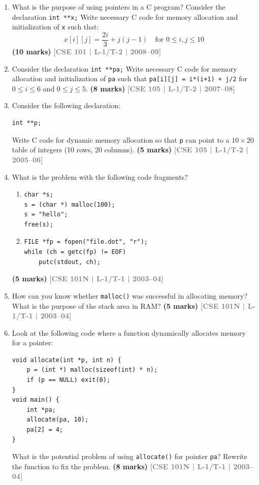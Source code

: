 \documentclass[12pt,a3paper]{article}
\newcommand{\yr}[1]{\hfill\textcolor{gray}{\small\textbf{[#1]}}}
\newcommand{\mk}[1]{\textcolor{orange!70!black}{\small\textbf{(#1 marks)}}}
\begin{document}
\begin{enumerate}
\item What is the purpose of using pointers in a C program? Consider the declaration \texttt{int **x;} Write necessary C code for memory allocation and initialization of \texttt{x} such that:
\[x[i][j] = \frac{2i}{3} + j(j-1) \quad \text{for } 0 \le i, j \le 10\]
\mk{10} \yr{CSE 101 | L-1/T-2 | 2008--09}


\item Consider the declaration \texttt{int **pa;} Write necessary C code for memory allocation and initialization of \texttt{pa} such that \texttt{pa[i][j] = i*(i+1) + j/2} for $0 \le i \le 6$ and $0 \le j \le 5$.
\mk{8} \yr{CSE 105 | L-1/T-2 | 2007--08}

\item Consider the following declaration:
\begin{lstlisting}
int **p;
\end{lstlisting}
Write C code for dynamic memory allocation so that \texttt{p} can point to a $10 \times 20$ table of integers (10 rows, 20 columns).
\mk{5} \yr{CSE 105 | L-1/T-2 | 2005--06}

\item What is the problem with the following code fragments?
 
\begin{enumerate}
  \item \begin{lstlisting}
char *s;
s = (char *) malloc(100);
s = "hello";
free(s);
\end{lstlisting}
  \item \begin{lstlisting}
FILE *fp = fopen("file.dot", "r");
while (ch = getc(fp) != EOF)
    putc(stdout, ch);
\end{lstlisting}
\end{enumerate}
\mk{5} \yr{CSE 101N | L-1/T-1 | 2003--04}

\item How can you know whether \texttt{malloc()} was successful in allocating memory? What is the purpose of the stack area in RAM?
\mk{5} \yr{CSE 101N | L-1/T-1 | 2003--04}

\item Look at the following code where a function dynamically allocates memory for a pointer:
 
\begin{lstlisting}
void allocate(int *p, int n) {
    p = (int *) malloc(sizeof(int) * n);
    if (p == NULL) exit(0);
}
void main() {
    int *pa;
    allocate(pa, 10);
    pa[2] = 4;
}
\end{lstlisting}
What is the potential problem of using \texttt{allocate()} for pointer \texttt{pa}? Rewrite the function to fix the problem.
\mk{8} \yr{CSE 101N | L-1/T-1 | 2003--04}


\end{enumerate}
\end{document}
